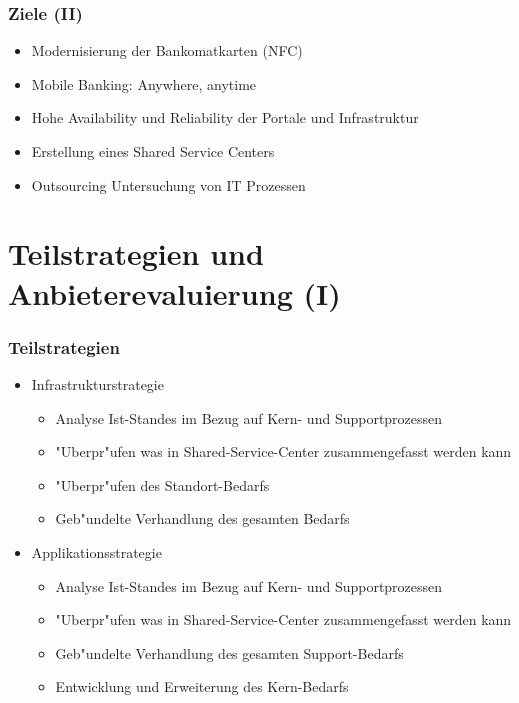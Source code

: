 \documentclass{beamer}
\begin{document}
\begin{frame}[plain]
  \frametitle{Ziele (II)}
  \begin{itemize}

	\item Modernisierung der Bankomatkarten (NFC)\vspace{2mm}
	\item Mobile Banking: Anywhere, anytime\vspace{2mm}
	\item Hohe Availability und Reliability der Portale und Infrastruktur\vspace{2mm}
	\item Erstellung eines Shared Service Centers \vspace{2mm}
	\item Outsourcing Untersuchung von IT Prozessen\vspace{2mm}

  \end{itemize}
\end{frame}


\section{Teilstrategien und Anbieterevaluierung (I)}

\begin{frame}[plain]
  \frametitle{Teilstrategien}
  \begin{itemize}

	\item Infrastrukturstrategie
		\begin{itemize}
			\item Analyse Ist-Standes im Bezug auf Kern- und Supportprozessen
			\item "Uberpr"ufen was in Shared-Service-Center zusammengefasst werden kann
			\item "Uberpr"ufen des  Standort-Bedarfs
			\item Geb"undelte Verhandlung des gesamten Bedarfs  \vspace{2mm}
		\end{itemize}
		
	\item Applikationsstrategie
			\begin{itemize}
			\item Analyse Ist-Standes im Bezug auf Kern- und Supportprozessen
			\item "Uberpr"ufen was in Shared-Service-Center zusammengefasst werden kann
			\item Geb"undelte Verhandlung des gesamten Support-Bedarfs
			\item Entwicklung und Erweiterung des Kern-Bedarfs  \vspace{2mm}
		\end{itemize}
  \end{itemize}
\end{frame}
\end{document}
